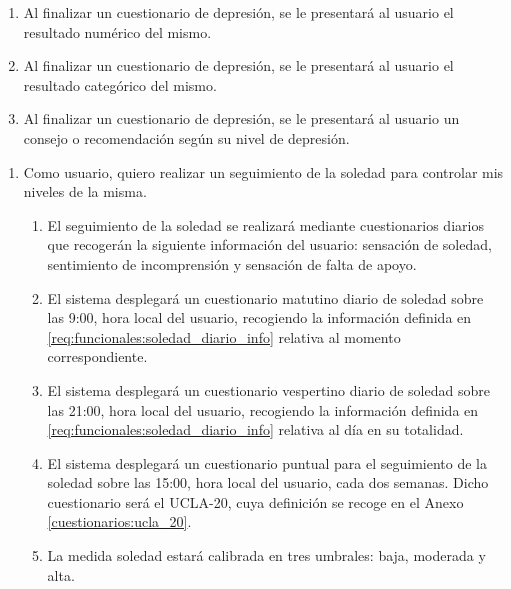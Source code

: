 \begin{enumerate}[resume=req-usuario,label=\textbf{\texttt{RU-\arabic*}}]
\begin{enumerate}[resume=req-funcionales,label=\textbf{\texttt{RF-\arabic*}}]
                \item \label{req:funcionales:depresion_cuestionario_numero} Al finalizar un cuestionario de depresión, se le presentará al usuario el resultado numérico del mismo.
                \item \label{req:funcionales:depresion_cuestionario_categoria} Al finalizar un cuestionario de depresión, se le presentará al usuario el resultado categórico del mismo.
                \item \label{req:funcionales:depresion_cuestionario_consejo} Al finalizar un cuestionario de depresión, se le presentará al usuario un consejo o recomendación según su nivel de depresión.
            \end{enumerate}
        \end{enumerate}
        \begin{enumerate}[resume=req-usuario,label=\textbf{\texttt{RU-\arabic*}}]
            \item \label{req:usuario:seguimiento_soledad} Como usuario, quiero realizar un seguimiento de la soledad para controlar mis niveles de la misma.
            \begin{enumerate}[resume=req-funcionales,label=\textbf{\texttt{RF-\arabic*}}]
                \item \label{req:funcionales:soledad_diario_info} El seguimiento de la soledad se realizará mediante cuestionarios diarios que recogerán la siguiente información del usuario: sensación de soledad, sentimiento de incomprensión y sensación de falta de apoyo.
                \item \label{req:funcionales:soledad_diario_manana} El sistema desplegará un cuestionario matutino diario de soledad sobre las 9:00, hora local del usuario, recogiendo la información definida en \ref{req:funcionales:soledad_diario_info} relativa al momento correspondiente.
                \item \label{req:funcionales:soledad_diario_noche}  El sistema desplegará un cuestionario vespertino diario de soledad sobre las 21:00, hora local del usuario, recogiendo la información definida en \ref{req:funcionales:soledad_diario_info} relativa al día en su totalidad.
                \item \label{req:funcionales:soledad_puntual} El sistema desplegará un cuestionario puntual para el seguimiento de la soledad sobre las 15:00, hora local del usuario, cada dos semanas. Dicho cuestionario será el UCLA-20, cuya definición se recoge en el Anexo \ref{cuestionarios:ucla_20}.
                \item \label{req:funcionales:soledad_umbrales} La medida soledad estará calibrada en tres umbrales: baja, moderada y alta.

\end{enumerate}
\end{enumerate}
